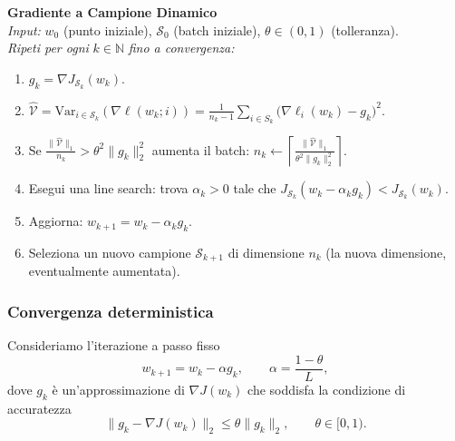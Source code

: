 \documentclass[a4paper,12pt]{article}
\numberwithin{equation}{section}
\numberwithin{figure}{section}
\numberwithin{table}{section}
\newcommand{\Var}{\mathrm{Var}}
\begin{document}
\begin{actionbox}
  \textbf{Gradiente a Campione Dinamico}\\[0.3cm]
  \textit{Input:} $w_0$ (punto iniziale), $\mathcal{S}_0$ (batch iniziale), $\theta \in (0,1)$ (tolleranza).\\[0.1cm]
  \textit{Ripeti per ogni } $k \in \mathbb{N}$ \textit{ fino a convergenza:}
  \begin{enumerate}
    \item $g_k = \nabla J_{\mathcal{S}_k}(w_k)$.
    \item $\widehat{\mathcal{V}} = \Var_{i \in \mathcal{S}_k}(\nabla \ell(w_k;i)) = \frac{1}{n_k - 1} \sum_{i \in S_k} \bigl(\nabla \ell_i(w_k) - g_k\bigr)^2
$.
    \item Se $\frac{\|\widehat{\mathcal{V}}\|_1}{n_k} > \theta^2 \|g_k\|_2^2$ aumenta il batch: $n_k \leftarrow \left\lceil \frac{\|\widehat{\mathcal{V}}\|_1}{\theta^2 \|g_k\|_2^2} \right\rceil$.
    \item Esegui una line search: trova $\alpha_k > 0$ tale che $J_{\mathcal{S}_k}(w_k - \alpha_k g_k) < J_{\mathcal{S}_k}(w_k)$.
    \item Aggiorna: $w_{k+1} = w_k - \alpha_k g_k$.
    \item Seleziona un nuovo campione $\mathcal{S}_{k+1}$ di dimensione $n_k$ (la nuova dimensione, eventualmente aumentata).
  \end{enumerate}
\end{actionbox}




\newpage
\subsubsection{Convergenza deterministica}\label{sec:convergenza-deterministica}

Consideriamo l'iterazione a passo fisso
\[
w_{k+1} = w_k - \alpha g_k, \qquad \alpha = \frac{1-\theta}{L},
\]
dove $g_k$ è un'approssimazione di $\nabla J(w_k)$ che soddisfa la condizione di accuratezza
\[
\|g_k - \nabla J(w_k)\|_2 \leq \theta \|g_k\|_2, \qquad \theta \in [0,1).
\label{eq:discesa}
\]
\end{document}
